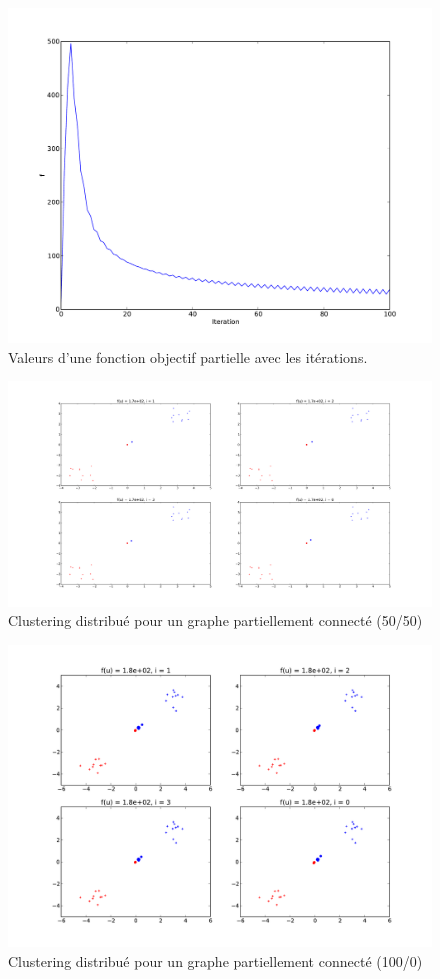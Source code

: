 \documentclass[a4paper]{article}
\begin{document}
\begin{figure}
\begin{center}
    \includegraphics[width=.9\textwidth]{figures/dda_w-bin_f.pdf}
\end{center}
\caption{Valeurs d'une fonction objectif partielle avec les itérations.}
\label{fig:dda_wbin_f}
\end{figure}

\begin{figure}
\begin{center}
    \includegraphics[width=.9\textwidth]{figures/dda_w_clust_G-half.pdf}
\end{center}
\caption{Clustering distribué pour un graphe partiellement connecté (50/50)}
\label{fig:dda_ghalf}
\end{figure}

\begin{figure}
\begin{center}
    \includegraphics[width=.9\textwidth]{figures/dda_w_clust_G-sep.pdf}
\end{center}
\caption{Clustering distribué pour un graphe partiellement connecté (100/0)}
\label{fig:dda_gsep}
\end{figure}
\end{document}
